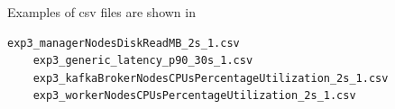 Examples of csv files are shown in

\begin{lstlisting}[label={lst:bench-csv-files}]
    exp3_managerNodesDiskReadMB_2s_1.csv
    exp3_generic_latency_p90_30s_1.csv
    exp3_kafkaBrokerNodesCPUsPercentageUtilization_2s_1.csv
    exp3_workerNodesCPUsPercentageUtilization_2s_1.csv
\end{lstlisting}


%
